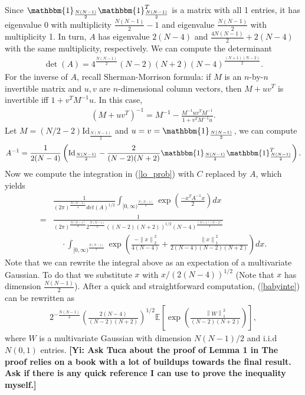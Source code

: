 \documentclass[10pt]{article}
\newcommand{\e}{\mathbb{E}}
\newcommand{\norm}[1]{\left\lVert#1\right\rVert}
\newcommand{\gy}[1]{\textbf{\color{red}[Yi: #1]}}
\newenvironment{Proof of lemma}{\noindent{\bf Proof of Lemma}}{\hfill$\Box$\newline}
\newenvironment{Proof of claim}{\noindent{\bf Proof of claim}}{\hfill$\Box$\newline}
\newenvironment{Proof of theorem}{\noindent{\bf Proof of Theorem}}{\hfill\scriptsize{$\Box$}\newline}
\newenvironment{Proof of theorems}{\noindent{\bf Proof of Theorems}}{\hfill$\Box$\newline}
\newenvironment{Proof of proposition}{\noindent{\bf Proof of Proposition}}{\hfill$\Box$\newline}
\newenvironment{Proof of propositions}{\noindent{\bf Proof of Propositions}}{\hfill$\Box$\newline}
\newenvironment{Proof of exercise}{\noindent{\it Proof of Exercise:}}{\hfill$\Box$}
\numberwithin{equation}{section}
\begin{document}
Since $\mathbbm{1}_{\frac{N(N-1)}{2}}\mathbbm{1}^T_{\frac{N(N-1)}{2}}$ is a matrix with all 1 entries, it has eigenvalue 0 with multiplicity $\frac{N(N-1)}{2} - 1$ and eigenvalue $\frac{N(N-1)}{2}$ with multiplicity 1. In turn, $A$ has eigenvalue $2(N-4)$ and $\frac{4N(N-1)}{2} + 2(N-4)$ with the same multiplicity, respectively. We can compute the determinant
\begin{align}
    \det(A) = 4^{\frac{N(N-1)}{2}}(N-2)(N+2) (N-4)^{\frac{(N+1)(N-2)}{2}}.
\end{align}
For the inverse of $A$, recall Sherman-Morrison formula: if $M$ is an $n$-by-$n$ invertible matrix and $u,v$ are $n$-dimensional column vectors, then $M+uv^T$ is invertible iff $1+v^TM^{-1}u$. In this case,
\begin{align} \label{sher_mor_formula}
    (M+uv^T)^{-1} = M^{-1} - \frac{M^{-1}uv^TM^{-1}}{1+v^TM^{-1}u}.
\end{align}
Let $M = (N/2-2)\text{Id}_{\frac{N(N-1)}{2}}$ and $u=v=\mathbbm{1}_{\frac{N(N-1)}{2}}$, we can compute
\begin{align} \label{babyinverse}
    A^{-1} = \frac{1}{2(N-4)} \left( \text{Id}_{\frac{N(N-1)}{2}} - \frac{2}{(N-2)(N+2)} \mathbbm{1}_{\frac{N(N-1)}{2}}\mathbbm{1}^T_{\frac{N(N-1)}{2}}\right).
\end{align}
Now we compute the integration in (\ref{lo_prob}) with $C$ replaced by $A$, which yields
\begin{align} \label{babyinte}
    &\frac{1}{(2 \pi)^{\frac{N(N-1)}{4}}det(A)^{1/2}}\int_{[0,\infty)^{\frac{N(N-1)}{2}}} \exp\left(\frac{-x^TA^{-1}x}{2}\right)dx \nonumber \\
    =&\frac{1}{(2 \pi)^{\frac{N(N-1)}{4}}2^{\frac{N(N-1)}{2}}\left((N-2)(N+2)\right)^{1/2} (N-4)^{\frac{(N+1)(N-2)}{4}}} \nonumber \\
    & \quad \cdot \int_{[0,\infty)^{\frac{N(N-1)}{2}}} \exp \left( \frac{-\norm{x}_2^2}{4(N-4)}+\frac{\norm{x}_1^2}{2(N-4)(N-2)(N+2)}\right)dx.
\end{align}
Note that we can rewrite the integral above as an expectation of a multivariate Gaussian. To do that we substitute $x$ with $x/(2(N-4))^{1/2}$ (Note that $x$ has dimension $\frac{N(N-1)}{2}$). After a quick and straightforward computation, (\ref{babyinte}) can be rewritten as
\begin{align} \label{babyexpect}
    2^{-\frac{N(N-1)}{2}}\left( \frac{2(N-4)}{(N-2)(N+2)}\right)^{1/2} \e \left[ \exp\left(\frac{\norm{W}^2_1}{(N-2)(N+2)}\right)\right],
\end{align}
where $W$ is a multivariate Gaussian with dimension $N(N-1)/2$ and i.i.d $N(0,1)$ entries.
\gy{Ask Tuca about the proof of Lemma 1 in \cite{SK_optimal} The proof relies on a book with a lot of buildups towards the final result. Ask if there is any quick reference I can use to prove the inequality myself.}
\end{document}
